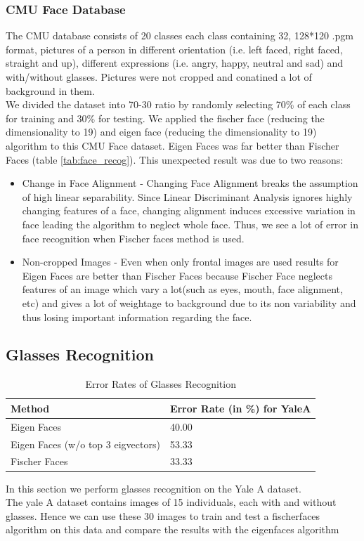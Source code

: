 \documentclass[12pt, a4paper]{article}
\begin{document}
\subsubsection{CMU Face Database}
The CMU database consists of 20 classes each class containing 32, 128*120 .pgm format, pictures of a person in different orientation (i.e. left faced, right faced, straight and up), different expressions (i.e. angry, happy, neutral and sad) and with/without glasses. Pictures were not cropped and conatined a lot of background in them. \\
We divided the dataset into 70-30 ratio by randomly selecting 70\% of each class for training and 30\% for testing.  We applied the fischer face (reducing the dimensionality to 19) and eigen face (reducing the dimensionality to 19) algorithm to this CMU Face dataset.
Eigen Faces was far better than Fischer Faces (table \ref{tab:face_recog}). This unexpected result was due to two reasons:
\begin{itemize}
    \item Change in Face Alignment - Changing Face Alignment breaks the assumption of high linear separability. Since Linear Discriminant Analysis ignores highly changing features of a face, changing alignment induces excessive variation in face leading the algorithm to neglect whole face. Thus, we see a lot of error in face recognition when Fischer faces method is used.
    \item Non-cropped Images - Even when only frontal images are used results for Eigen Faces are better than Fischer Faces because Fischer Face neglects features of an image which vary a lot(such as eyes, mouth, face alignment, etc) and gives a lot of weightage to background due to its non variability and thus losing important information regarding the face. 
\end{itemize}
\subsection{Glasses Recognition}
\begin{table}[H]
    \centering
    \begin{tabular}{ |p{4.1cm}|p{6.5cm}|  }
 \hline
 Method & Error Rate (in \%) for YaleA  \\
 \hline
 Eigen Faces & 40.00 \\
 \hline
 Eigen Faces \newline (w/o top 3 eigvectors) & 53.33 \\
 \hline
 Fischer Faces & 33.33 \\
 \hline
\end{tabular}
    \caption{Error Rates of Glasses Recognition}
    \label{tab:glasses_recog}
\end{table}
In this section we perform glasses recognition on the Yale A dataset. \\
The yale A dataset contains images of 15 individuals, each with and without glasses. Hence we can use these 30 images to train and test a fischerfaces algorithm on this data and compare the results with the eigenfaces algorithm \\
\end{document}
